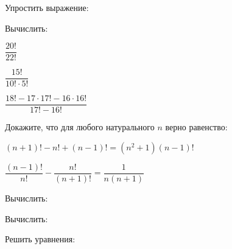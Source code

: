 \begin{listofex}
	\item Упростить выражение:
	\begin{enumcols}[itemcolumns=2]
		\item {}
		\item {}
		\item {}
	\end{enumcols}
	\item Вычислить:
	\begin{enumcols}[itemcolumns=3]
		\item \( \dfrac{20!}{22!} \) 
		\item \( \dfrac{15!}{10!\cdot5!} \) 
		\item \( \dfrac{18!-17\cdot17!-16\cdot16!}{17!-16!} \) 
	\end{enumcols}
	\item Докажите, что для любого натурального \( n \) верно равенство:
	\begin{enumcols}[itemcolumns=2]
		\item \( (n+1)!-n!+(n-1)! = (n^2+1)(n-1)! \)
		\item \( \dfrac{(n-1)!}{n!}-\dfrac{n!}{(n+1)!}=\dfrac{1}{n(n+1)} \)
	\end{enumcols}
	\item {}
	\item Вычислить:
	\begin{enumcols}[itemcolumns=2]
		\item {}
		\item {}
		\item {}
		\item {}
	\end{enumcols}
	\item Вычислить:
	\begin{enumcols}[itemcolumns=2]
		\item {}
		\item {}
	\end{enumcols}
	\item Решить уравнения:
	\begin{enumcols}[itemcolumns=2]
		\item {}
		\item {}
	\end{enumcols}
\end{listofex}
\newpage
